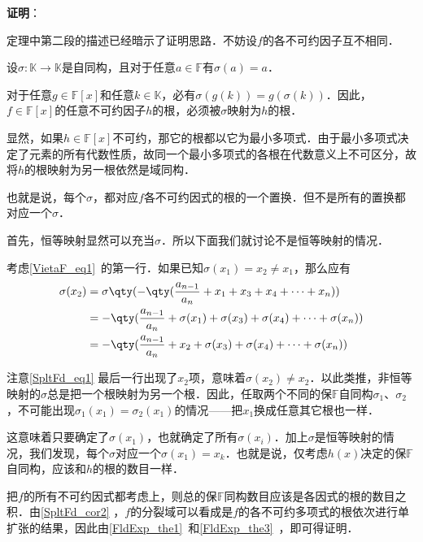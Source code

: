 \textbf{证明}：

定理中第二段的描述已经暗示了证明思路．不妨设$f$的各不可约因子互不相同．

设$\sigma:\mathbb{K}\to\mathbb{K}$是自同构，且对于任意$a\in\mathbb{F}$有$\sigma(a)=a$．

对于任意$g\in\mathbb{F}[x]$和任意$k\in\mathbb{K}$，必有$\sigma(g(k))=g(\sigma(k))$．因此，$f\in\mathbb{F}[x]$的任意不可约因子$h$的根，必须被$\sigma$映射为$h$的根．


显然，如果$h\in\mathbb{F}[x]$不可约，那它的根都以它为最小多项式．由于最小多项式决定了元素的所有代数性质，故同一个最小多项式的各根在代数意义上不可区分，故将$h$的根映射为另一根依然是域同构．

也就是说，每个$\sigma$，都对应$f$各不可约因式的根的一个置换．但不是所有的置换都对应一个$\sigma$．

首先，恒等映射显然可以充当$\sigma$．所以下面我们就讨论不是恒等映射的情况．

考虑\autoref{VietaF_eq1}~的第一行．如果已知$\sigma(x_1)=x_2\not = x_1$，那么应有
\begin{equation}\label{SpltFd_eq1}
\begin{aligned}
\sigma(x_2) &= \sigma\qty(-\qty(\frac{a_{n-1}}{a_n}+x_1+x_3+x_4+\cdots+x_n))\\
&= -\qty(\frac{a_{n-1}}{a_n}+\sigma(x_1)+\sigma(x_3)+\sigma(x_4)+\cdots+\sigma(x_n))\\
&= -\qty(\frac{a_{n-1}}{a_n}+x_2+\sigma(x_3)+\sigma(x_4)+\cdots+\sigma(x_n))\\
\end{aligned}
\end{equation}

注意\autoref{SpltFd_eq1} 最后一行出现了$x_2$项，意味着$\sigma(x_2)\not = x_2$．以此类推，非恒等映射的$\sigma$总是把一个根映射为另一个根．因此，任取两个不同的保$\mathbb{F}$自同构$\sigma_1$、$\sigma_2$，不可能出现$\sigma_1(x_1)=\sigma_2(x_1)$的情况——把$x_1$换成任意其它根也一样．

这意味着只要确定了$\sigma(x_1)$，也就确定了所有$\sigma(x_i)$．加上$\sigma$是恒等映射的情况，我们发现，每个$\sigma$对应一个$\sigma(x_1)=x_k$．也就是说，仅考虑$h(x)$决定的保$\mathbb{F}$自同构，应该和$h$的根的数目一样．

把$f$的所有不可约因式都考虑上，则总的保$\mathbb{F}$同构数目应该是各因式的根的数目之积．由\autoref{SpltFd_cor2} ，$f$的分裂域可以看成是$f$的各不可约多项式的根依次进行单扩张的结果，因此由\autoref{FldExp_the1}~和\autoref{FldExp_the3}~，即可得证明．




